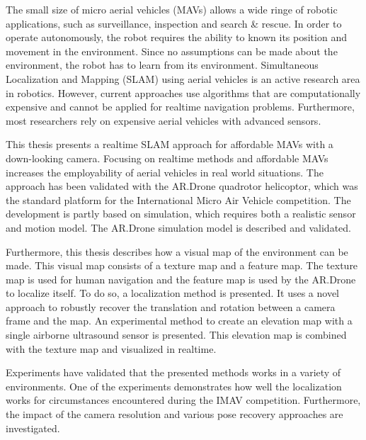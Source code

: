 The small size of micro aerial vehicles (MAVs) allows a wide ringe of robotic applications, such as surveillance, inspection and search \& rescue.
In order to operate autonomously, the robot requires the ability to known its position and movement in the environment.
Since no assumptions can be made about the environment, the robot has to learn from its environment.
Simultaneous Localization and Mapping (SLAM) using aerial vehicles is an active research area in robotics.
However, current approaches use algorithms that are computationally expensive and cannot be applied for realtime navigation problems.
Furthermore, most researchers rely on expensive aerial vehicles with advanced sensors.

This thesis presents a realtime SLAM approach for affordable MAVs with a down-looking camera.
Focusing on realtime methods and affordable MAVs increases the employability of aerial vehicles in  real world situations.
The approach has been validated with the AR.Drone quadrotor helicoptor, which was the standard platform for the International Micro Air Vehicle competition.
The development is partly based on simulation, which requires both a realistic sensor and motion model.
The AR.Drone simulation model is described and validated.

Furthermore, this thesis describes how a visual map of the environment can be made.
This visual map consists of a texture map and a feature map. The texture map is used for human navigation and the feature map is used by the AR.Drone to localize itself.
To do so, a localization method is presented.
It uses a novel approach to robustly recover the translation and rotation between a camera frame and the map.
An experimental method to create an elevation map with a single airborne ultrasound sensor is presented.
This elevation map is combined with the texture map and visualized in realtime.

Experiments have validated that the presented methods works in a variety of environments.
One of the experiments demonstrates how well the localization works for circumstances encountered during the IMAV competition. 
Furthermore, the impact of the camera resolution and various pose recovery approaches are investigated.





